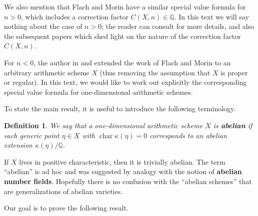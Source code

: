 \documentclass{article}
\DeclareMathOperator{\fchar}{char}
\newcommand{\QQ}{\mathbb{Q}}
\theoremstyle{myplain}
\theoremstyle{mydefinition}
\newtheorem{definition}[theorem]{Definition}
\begin{document}
We also mention that Flach and Morin have a similar special value formula for
$n > 0$, which includes a correction factor $C (X,n) \in \QQ$. In this text we
will say nothing about the case of $n > 0$; the reader can consult
\cite{Flach-Morin-2018} for more details, and also the subsequent papers
\cite{Flach-Morin-2020,Flach-Morin-2020-Muenster,Morin-2021-THH} which shed
light on the nature of the correction factor $C (X,n)$.

For $n < 0$, the author in \cite{Beshenov-Weil-etale-1} and
\cite{Beshenov-Weil-etale-2} extended the work of Flach and Morin
\cite{Flach-Morin-2018} to an arbitrary arithmetic scheme $X$ (thus removing the
assumption that $X$ is proper or regular). In this text, we would like to work
out explicitly the corresponding special value formula for one-dimensional
arithmetic schemes.

\vspace{1em}

To state the main result, it is useful to introduce the following terminology.

\begin{definition}
  \label{dfn:abelian-scheme}
  We say that a one-dimensional arithmetic scheme $X$ is \textbf{abelian} if
  each generic point $\eta \in X$ with $\fchar \kappa (\eta) = 0$ corresponds to
  an abelian extension $\kappa (\eta)/\QQ$.
\end{definition}

If $X$ lives in positive characteristic, then it is trivially abelian.
The term ``abelian'' is ad hoc and was suggested by analogy with the notion of
\textbf{abelian number fields}. Hopefully there is no confusion with the
``abelian schemes'' that are generalizations of abelian varieties.

\pagebreak

Our goal is to prove the following result.
\end{document}

